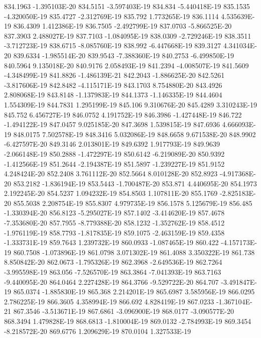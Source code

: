 834.1963  -1.395103E-20
834.5151  -3.597403E-19
834.834  -5.440418E-19
835.1535  -4.320050E-19
835.4727  -2.312769E-19
835.792  1.773265E-19
836.1114  4.535639E-19
836.4309  1.412386E-19
836.7505  -2.492799E-19
837.0703  -5.866525E-20
837.3903  2.488027E-19
837.7103  -1.084095E-19
838.0309  -2.729246E-19
838.3511  -3.712723E-19
838.6715  -8.085760E-19
838.992  -6.447668E-19
839.3127  4.341034E-20
839.6334  -1.985514E-20
839.9543  -7.388360E-19
840.2753  -6.499850E-19
840.5964  9.135018E-20
840.9176  2.058493E-19
841.2394  -4.008507E-19
841.5609  -4.348499E-19
841.8826  -1.486139E-21
842.2043  -1.886625E-20
842.5261  -3.817606E-19
842.8482  -4.115171E-19
843.1703  8.754880E-20
843.4926  2.808068E-19
843.8148  -1.137983E-19
844.1373  -1.146335E-19
844.4604  1.554309E-19
844.7831  1.295199E-19
845.106  9.310676E-20
845.4289  3.310243E-19
845.752  6.456727E-19
846.0752  4.191752E-19
846.3986  -1.427448E-19
846.722  -1.494122E-19
847.0457  9.025185E-20
847.3698  1.539815E-19
847.6936  4.666093E-19
848.0175  7.502578E-19
848.3416  5.032086E-19
848.6658  9.671538E-20
848.9902  -6.427597E-20
849.3146  2.013801E-19
849.6392  1.917793E-19
849.9639  -2.066148E-19
850.2888  -1.472297E-19
850.6142  -6.219089E-20
850.9392  -1.412566E-19
851.2644  -2.194387E-19
851.5897  -1.239227E-19
851.9152  4.248424E-20
852.2408  3.761112E-20
852.5664  8.010128E-20
852.8923  -4.917368E-20
853.2182  -1.836194E-19
853.5443  -1.700487E-20
853.871  4.440695E-20
854.1973  2.192245E-20
854.5237  1.094232E-19
854.8503  1.107811E-20
855.1769  -2.825183E-20
855.5038  2.208754E-19
855.8307  4.979735E-19
856.1578  5.125679E-19
856.485  -1.330394E-20
856.8123  -5.295027E-19
857.1402  -3.414620E-19
857.4678  -7.353680E-20
857.7955  -8.779388E-20
858.1232  -1.352762E-19
858.4512  -1.976119E-19
858.7793  -1.817835E-19
859.1075  -2.463159E-19
859.4358  -1.333731E-19
859.7643  1.239732E-19
860.0933  -1.087465E-19
860.422  -4.157173E-19
860.7508  -1.073896E-19
861.0798  3.071302E-19
861.4088  3.350322E-19
861.738  8.850842E-20
862.0673  -1.795326E-19
862.3968  -2.649536E-19
862.7264  -3.995598E-19
863.056  -7.526570E-19
863.3864  -7.041393E-19
863.7163  -9.440095E-20
864.0464  2.227428E-19
864.3766  -9.529722E-20
864.707  -3.491847E-19
865.0374  -1.885830E-19
865.368  2.214201E-19
865.6987  3.585956E-19
866.0295  2.786225E-19
866.3605  4.358994E-19
866.692  4.828419E-19
867.0233  -1.367104E-21
867.3546  -3.513671E-19
867.6861  -3.096900E-19
868.0177  -3.090577E-20
868.3494  1.479828E-19
868.6813  -1.810004E-19
869.0132  -2.784993E-19
869.3454  -8.218572E-20
869.6776  1.209629E-19
870.0104  1.327533E-19
